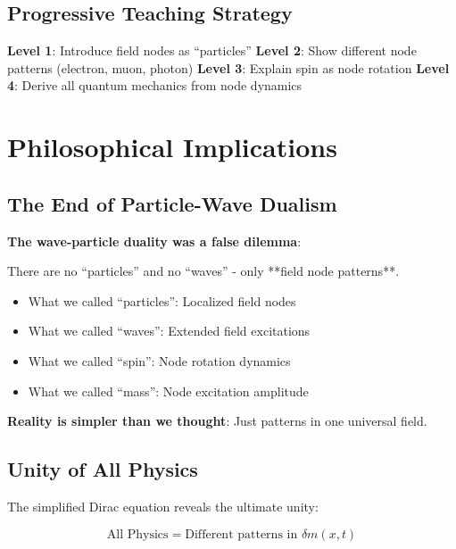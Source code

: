 \documentclass[12pt,a4paper]{article}
\newcommand{\deltam}{\delta m}
\theoremstyle{definition}
\theoremstyle{remark}
\begin{document}
	\subsection{Progressive Teaching Strategy}
	
	\textbf{Level 1}: Introduce field nodes as ``particles''
	\textbf{Level 2}: Show different node patterns (electron, muon, photon)
	\textbf{Level 3}: Explain spin as node rotation
	\textbf{Level 4}: Derive all quantum mechanics from node dynamics
	
	\section{Philosophical Implications}
	
	\subsection{The End of Particle-Wave Dualism}
	
	\begin{tcolorbox}[colback=purple!5!white,colframe=purple!75!black,title=Philosophical Revolution]
		\textbf{The wave-particle duality was a false dilemma}:
		
		There are no ``particles'' and no ``waves'' - only **field node patterns**.
		
		\begin{itemize}
			\item What we called ``particles'': Localized field nodes
			\item What we called ``waves'': Extended field excitations  
			\item What we called ``spin'': Node rotation dynamics
			\item What we called ``mass'': Node excitation amplitude
		\end{itemize}
		
		\textbf{Reality is simpler than we thought}: Just patterns in one universal field.
	\end{tcolorbox}
	
	\subsection{Unity of All Physics}
	
	The simplified Dirac equation reveals the ultimate unity:
	
	\begin{equation}
		\text{All Physics} = \text{Different patterns in } \deltam(x,t)
	\end{equation}
	
\end{document}
